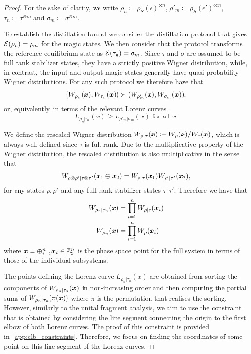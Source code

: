 \documentclass[pra,
aps,
twocolumn,
superscriptaddress,
groupedaddress,
nofootinbib,
reprint
]{revtex4-1}
\begin{document}
\begin{proof}	
For the sake of clarity, we write $\rho_n \coloneqq \rho_S(\epsilon)^{\otimes n}$, $\rho'_m \coloneqq \rho_S(\epsilon')^{\otimes m}$, $\tau_n \coloneqq \tau^{\otimes m}$ and $\sigma_m \coloneqq \sigma^{\otimes m}$. 

To establish the distillation bound we consider the distillation protocol that gives ${\mathcal E}( \rho_n) = \rho_m$ for the magic states. 
We then consider that the protocol transforms the reference equilibrium state as ${\mathcal E}( \tau_n) = \sigma_m$.
Since $\tau$ and $\sigma$ are assumed to be full rank stabilizer states, they have a strictly positive Wigner distribution, while, in contrast, the input and output magic states generally have quasi-probability Wigner distributions. 
For any such protocol we therefore have that
\begin{equation}
	( W_{\rho_n}(\bm{x}), W_{\tau_n}(\bm{x}) ) \succ ( W_{\rho'_m}(\bm{x}), W_{\sigma_m}(\bm{x}) ),
\end{equation}
or, equivalently, in terms of the relevant Lorenz curves,
\begin{equation}
	L_{\rho_n |\tau_n}(x) \ge L_{\rho'_m |\sigma_m}(x) \mbox{ for all } x.
\end{equation}

We define the rescaled Wigner distribution $W_{\rho | \tau}(\boldsymbol{x}) \coloneqq W_\rho(\boldsymbol{x})/W_\tau(\boldsymbol{x})$, which is always well-defined since $\tau$ is full-rank. 
Due to the multiplicative property of the Wigner distribution, the rescaled distribution is also multiplicative in the sense that
\begin{equation}
	W_{\rho \otimes \rho' | \tau \otimes \tau'} (\boldsymbol{x}_1 \oplus \boldsymbol{x}_2) = W_{\rho | \tau}(\boldsymbol{x}_1)W_{\rho' | \tau'}(\boldsymbol{x}_2),
\end{equation}
for any states $\rho, \rho'$ and any full-rank stabilizer states $\tau, \tau'$.
Therefore we have that
\begin{align}
	W_{\rho_n |\tau_n} (\boldsymbol{x}) &= \prod_{i=1}^n W_{\rho|\tau}(\boldsymbol{x}_i)\\
	W_{\rho_n } (\boldsymbol{x}) &= \prod_{i=1}^n W_\rho(\boldsymbol{x}_i)
\end{align}
where $\boldsymbol{x} = \oplus_{i=1}^n \boldsymbol{x}_i \in \mathbb{Z}_3^n$ is the phase space point for the full system in terms of those of the individual subsystems.

The points defining the Lorenz curve $L_{\rho_n |\tau_n}(x)$ are obtained from sorting the components of $W_{\rho_n |\tau_n}(\boldsymbol{x})$ in non-increasing order and then computing the partial sums of $W_{\rho_n |\tau_n}(\pi(\boldsymbol{x}))$ where $\pi$ is the permutation that realises the sorting. 
However, similarly to the unital fragment analysis, we aim to use the constraint that is obtained by considering the line segment connecting the origin to the first elbow of both Lorenz curves.
The proof of this constraint is provided in~\cref{app:elb_constraints}.
Therefore, we focus on finding the coordinates of some point on this line segment of the Lorenz curves.


\end{proof}
\end{document}
